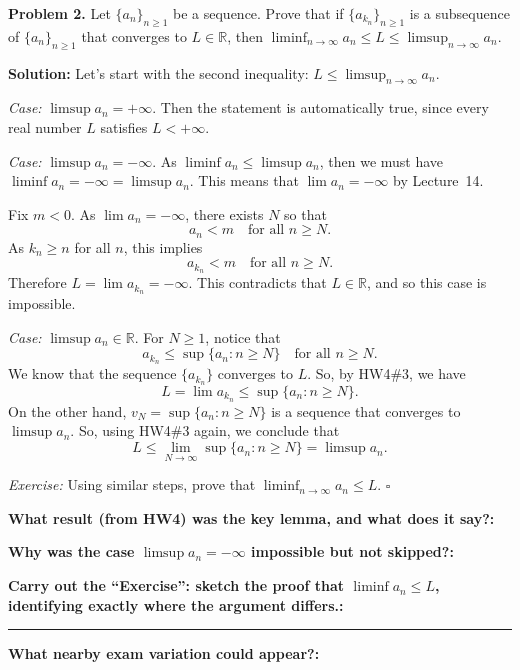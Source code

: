 \documentclass[12pt]{article}
\newcommand{\fillfield}[1]{%
  \par\noindent\textbf{#1:}\enspace\hrulefill\par\vspace{3pt}%
}
\newcommand{\fillfieldlong}[1]{%
  \par\noindent\textbf{#1:}\par\vspace{1.5cm}%
  \noindent\rule{\linewidth}{0.35pt}\par\vspace{4pt}%
}
\begin{document}
\begin{tcolorbox}[
  enhanced, breakable,
  colback  = solgreen,
  colframe = green!45!black,
  fonttitle = \bfseries,
  title = {\textsc{Official Solution}\hfill Homework 5 -- Selected Solutions}
]
\textbf{Problem 2.}
Let $\{a_n\}_{n \geq 1}$ be a sequence.
Prove that if $\{a_{k_n}\}_{n \geq 1}$ is a subsequence of $\{a_n\}_{n \geq 1}$
that converges to $L \in \mathbb{R}$, then
$\displaystyle\liminf_{n \to \infty} a_n \leq L \leq \limsup_{n \to \infty} a_n$.

\medskip
\textbf{Solution:}
Let's start with the second inequality: $L \leq \limsup_{n\to\infty} a_n$.

\medskip
\textit{Case:} $\limsup a_n = +\infty$.
Then the statement is automatically true, since every real number $L$
satisfies $L < +\infty$.

\medskip
\textit{Case:} $\limsup a_n = -\infty$.
As $\liminf a_n \leq \limsup a_n$, then we must have
$\liminf a_n = -\infty = \limsup a_n$.
This means that $\lim a_n = -\infty$ by Lecture~14.

Fix $m < 0$.
As $\lim a_n = -\infty$, there exists $N$ so that
\[
  a_n < m \quad \text{for all } n \geq N.
\]
As $k_n \geq n$ for all $n$, this implies
\[
  a_{k_n} < m \quad \text{for all } n \geq N.
\]
Therefore $L = \lim a_{k_n} = -\infty$.
This contradicts that $L \in \mathbb{R}$, and so this case is impossible.

\medskip
\textit{Case:} $\limsup a_n \in \mathbb{R}$.
For $N \geq 1$, notice that
\[
  a_{k_n} \leq \sup\{a_n : n \geq N\} \quad \text{for all } n \geq N.
\]
We know that the sequence $\{a_{k_n}\}$ converges to $L$.
So, by HW4\#3, we have
\[
  L = \lim a_{k_n} \leq \sup\{a_n : n \geq N\}.
\]
On the other hand, $v_N = \sup\{a_n : n \geq N\}$ is a sequence that converges
to $\limsup a_n$.
So, using HW4\#3 again, we conclude that
\[
  L \leq \lim_{N \to \infty} \sup\{a_n : n \geq N\} = \limsup a_n.
\]

\medskip
\textit{Exercise:}
Using similar steps, prove that $\displaystyle\liminf_{n \to \infty} a_n \leq L$.
\hfill$\square$
\end{tcolorbox}

\bigskip

\begin{tcolorbox}[
  enhanced, breakable,
  colback  = reflectcyan,
  colframe = cyan!55!black,
  fonttitle = \bfseries,
  title = {\textsc{Reflection \& Variation}}
]
\fillfield{What result (from HW4) was the key lemma, and what does it say?}
\fillfield{Why was the case $\limsup a_n = -\infty$ impossible but not skipped?}
\fillfieldlong{%
  Carry out the ``Exercise'': sketch the proof that $\liminf a_n \leq L$,
  identifying exactly where the argument differs.}
\fillfield{What nearby exam variation could appear?}
\end{tcolorbox}
\end{document}
